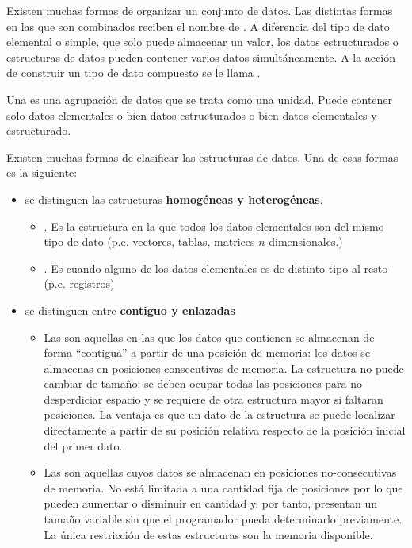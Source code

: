 Existen muchas formas de organizar un conjunto de datos. Las distintas formas en las que  son combinados reciben el nombre de . A diferencia del tipo de dato elemental o simple, que solo puede almacenar un valor, los datos estructurados o estructuras de datos pueden contener varios datos simultáneamente. A la acción de construir un tipo de dato compuesto se le llama .

Una  es una agrupación de datos que se trata como una unidad. Puede contener solo datos elementales o bien datos estructurados o bien datos elementales y estructurado. 


Existen muchas formas de clasificar las estructuras de datos. Una de esas formas es la siguiente:

\begin{itemize}
\item {} se distinguen las estructuras \textbf{homogéneas y heterogéneas}. 
	\begin{itemize}
	\item {}. Es la estructura en la que todos los datos elementales son del mismo tipo de dato (p.e. vectores, tablas, matrices $n$-dimensionales.)
	\item {}. Es cuando alguno de los datos elementales es de distinto tipo al resto (p.e. registros)
	\end{itemize}
	
\item {} se distinguen entre {\bf contiguo y enlazadas}
	\begin{itemize}
	\item Las  son aquellas en las que los datos que contienen se almacenan de forma ``contigua'' a partir de una posición de memoria: los datos se almacenas en posiciones consecutivas de memoria. La estructura no puede cambiar de tamaño: se deben ocupar todas las posiciones para no desperdiciar espacio y se requiere de otra estructura mayor si faltaran posiciones. La ventaja es que un dato de la estructura se puede localizar directamente a partir de su posición relativa respecto de la posición inicial del primer dato. 
	\item Las  son aquellas cuyos datos se almacenan en posiciones no-consecutivas de memoria. No está limitada a una cantidad fija de posiciones por lo que pueden aumentar o disminuir en cantidad y, por tanto, presentan un tamaño variable sin que el programador pueda determinarlo previamente. La única restricción de estas estructuras son la memoria disponible.
	\end{itemize}
	

\end{itemize}
